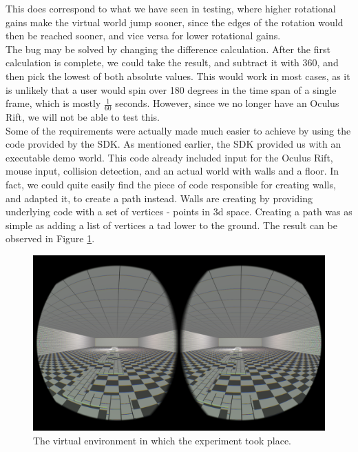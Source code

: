 This does correspond to what we have seen in testing, where higher rotational gains make the virtual world jump sooner, since the edges of the rotation would then be reached sooner, and vice versa for lower rotational gains. \\
The bug may be solved by changing the difference calculation.
After the first calculation is complete, we could take the result, and subtract it with 360, and then pick the lowest of both absolute values.
This would work in most cases, as it is unlikely that a user would spin over 180 degrees in the time span of a single frame, which is mostly $\frac{1}{60}$ seconds.
However, since we no longer have an Oculus Rift, we will not be able to test this. \\

Some of the requirements were actually made much easier to achieve by using the code provided by the SDK.
As mentioned earlier, the SDK provided us with an executable demo world.
This code already included input for the Oculus Rift, mouse input, collision detection, and an actual world with walls and a floor.
In fact, we could quite easily find the piece of code responsible for creating walls, and adapted it, to create a path instead.
Walls are creating by providing underlying code with a set of vertices - points in 3d space.
Creating a path was as simple as adding a list of vertices a tad lower to the ground.
The result can be observed in Figure \ref{fig:tinyroom}.

\begin{figure}
	\centering
	\includegraphics[width=\linewidth]{sections/finalreport/images/tinyroom.png}	
	\caption{The virtual environment in which the experiment took place.}
	\label{fig:tinyroom}
\end{figure}

